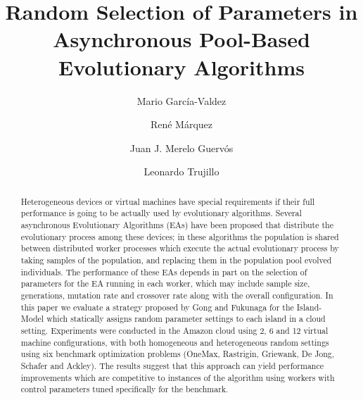 \documentclass{llncs}
\begin{document}
\sloppy

\title{Random Selection of Parameters in Asynchronous Pool-Based Evolutionary Algorithms}

\author{Mario Garc\'ia-Valdez \and Ren\'e M\'arquez \and Juan J. Merelo Guerv\'os \and  Leonardo Trujillo }


\maketitle

\begin{abstract}
Heterogeneous devices or virtual machines have special requirements if
their full performance is going to be actually used by evolutionary
algorithms. Several asynchronous Evolutionary Algorithms (EAs) have
been proposed that distribute the evolutionary process among these
devices; in these algorithms the population is shared between
distributed worker processes which execute the actual evolutionary
process by taking samples of the population, and replacing them in the
population pool evolved individuals. The performance of these EAs
depends in part on the selection of parameters for the EA running in
each worker, which may include sample size, generations, mutation rate
and crossover rate along with the overall configuration. In this paper
we evaluate a strategy proposed by Gong and Fukunaga for the
Island-Model which statically assigns random parameter settings to
each island in a cloud setting. Experiments were conducted in the
Amazon cloud using 2, 6 and 12 virtual machine configurations, with
both homogeneous and heterogeneous random settings using six benchmark
optimization problems (OneMax, Rastrigin, Griewank, De Jong, Schafer
and Ackley). The results suggest that this approach can yield
performance improvements which are competitive to instances of the
algorithm using workers with control parameters tuned specifically for
the benchmark.

\end{abstract}
\end{document}
